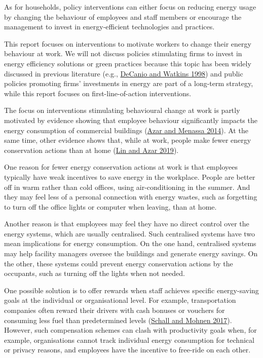 \documentclass[
  11pt,
  captions=heading]{scrreport}
\begin{document}
As for households, policy interventions can either focus on reducing
energy usage by changing the behaviour of employees and staff members or
encourage the management to invest in energy-efficient technologies and
practices.

This report focuses on interventions to motivate workers to change their
energy behaviour at work. We will not discuss policies stimulating firms
to invest in energy efficiency solutions or green practices because this
topic has been widely discussed in previous literature (e.g.,
\protect\hyperlink{ref-decanio1998investment}{DeCanio and Watkins 1998})
and public policies promoting firms' investments in energy are part of a
long-term strategy, while this report focuses on first-line-of-action
interventions.

The focus on interventions stimulating behavioural change at work is
partly motivated by evidence showing that employee behaviour
significantly impacts the energy consumption of commercial buildings
(\protect\hyperlink{ref-azar2014comprehensive}{Azar and Menassa 2014}).
At the same time, other evidence shows that, while at work, people make
fewer energy conservation actions than at home
(\protect\hyperlink{ref-lin2019mixing}{Lin and Azar 2019}).

One reason for fewer energy conservation actions at work is that
employees typically have weak incentives to save energy in the
workplace. People are better off in warm rather than cold offices, using
air-conditioning in the summer. And they may feel less of a personal
connection with energy wastes, such as forgetting to turn off the office
lights or computer when leaving, than at home.

Another reason is that employees may feel they have no direct control
over the energy systems, which are usually centralised. Such centralised
systems have two mean implications for energy consumption. On the one
hand, centralised systems may help facility managers oversee the
buildings and generate energy savings. On the other, these systems could
prevent energy conservation actions by the occupants, such as turning
off the lights when not needed.

One possible solution is to offer rewards when staff achieves specific
energy-saving goals at the individual or organisational level. For
example, transportation companies often reward their drivers with cash
bonuses or vouchers for consuming less fuel than predetermined levels
(\protect\hyperlink{ref-schall2017incentivizing}{Schall and Mohnen
2017}). However, such compensation schemes can clash with productivity
goals when, for example, organisations cannot track individual energy
consumption for technical or privacy reasons, and employees have the
incentive to free-ride on each other.
\end{document}
